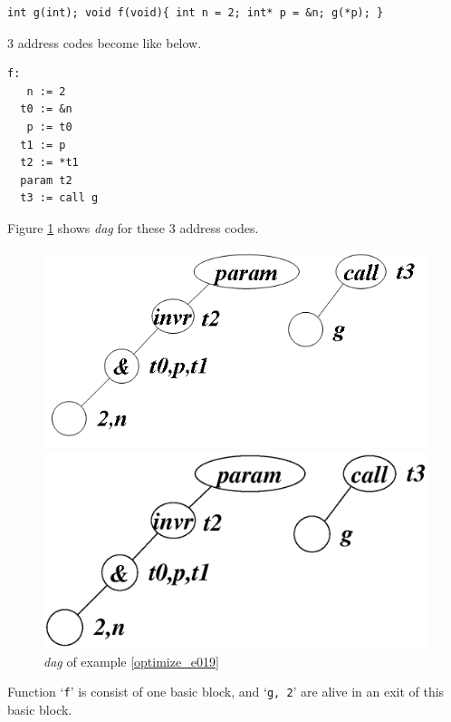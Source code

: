 \begin{Example}
\label{optimize_e019}
\begin{verbatim}
int g(int); void f(void){ int n = 2; int* p = &n; g(*p); }
\end{verbatim}
3 address codes become like below.
\begin{verbatim}
f:
   n := 2
  t0 := &n
   p := t0
  t1 := p
  t2 := *t1
  param t2
  t3 := call g
\end{verbatim}
Figure \ref{optimize_e020} shows {\em dag} for these 3 address codes.
\begin{figure}[htbp]
\begin{center}
\begin{htmlonly}
\includegraphics[width=1.0\linewidth,height=0.507\linewidth]{opt008.png}
\end{htmlonly}
\begin{latexonly}
\includegraphics[width=1.0\linewidth,height=0.507\linewidth]{opt008.eps}
\end{latexonly}
\caption{{\em dag} of example \ref{optimize_e019}}
\label{optimize_e020}
\end{center}
\end{figure}
Function `{\tt{f}}' is consist of one basic block, and 
`{\tt{g, 2}}' are alive in an exit of this basic block.

\end{Example}
